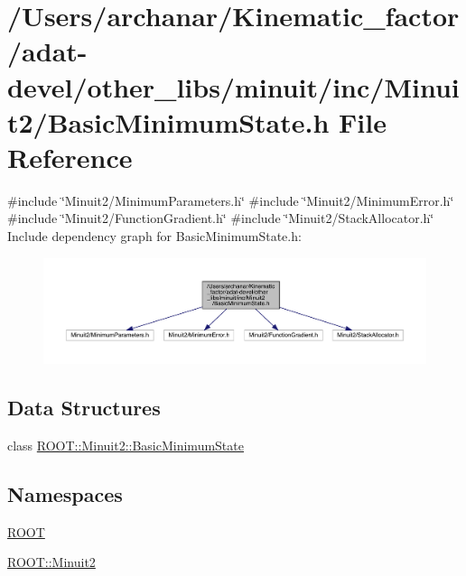 \hypertarget{adat-devel_2other__libs_2minuit_2inc_2Minuit2_2BasicMinimumState_8h}{}\section{/\+Users/archanar/\+Kinematic\+\_\+factor/adat-\/devel/other\+\_\+libs/minuit/inc/\+Minuit2/\+Basic\+Minimum\+State.h File Reference}
\label{adat-devel_2other__libs_2minuit_2inc_2Minuit2_2BasicMinimumState_8h}
{\ttfamily \#include \char`\"{}Minuit2/\+Minimum\+Parameters.\+h\char`\"{}}\newline
{\ttfamily \#include \char`\"{}Minuit2/\+Minimum\+Error.\+h\char`\"{}}\newline
{\ttfamily \#include \char`\"{}Minuit2/\+Function\+Gradient.\+h\char`\"{}}\newline
{\ttfamily \#include \char`\"{}Minuit2/\+Stack\+Allocator.\+h\char`\"{}}\newline
Include dependency graph for Basic\+Minimum\+State.\+h\+:
\nopagebreak
\begin{figure}[H]
\begin{center}
\leavevmode
\includegraphics[width=350pt]{d9/d1e/adat-devel_2other__libs_2minuit_2inc_2Minuit2_2BasicMinimumState_8h__incl}
\end{center}
\end{figure}
\subsection*{Data Structures}
\begin{DoxyCompactItemize}
\item 
class \mbox{\hyperlink{classROOT_1_1Minuit2_1_1BasicMinimumState}{R\+O\+O\+T\+::\+Minuit2\+::\+Basic\+Minimum\+State}}
\end{DoxyCompactItemize}
\subsection*{Namespaces}
\begin{DoxyCompactItemize}
\item 
 \mbox{\hyperlink{namespaceROOT}{R\+O\+OT}}
\item 
 \mbox{\hyperlink{namespaceROOT_1_1Minuit2}{R\+O\+O\+T\+::\+Minuit2}}
\end{DoxyCompactItemize}
